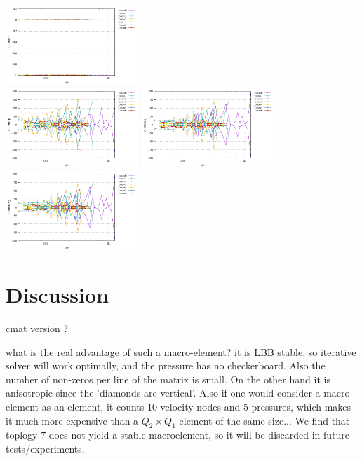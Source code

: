 \begin{center}
\includegraphics[width=5cm]{python_codes/fieldstone_78/results/stats_v_exp14.pdf}\\
\includegraphics[width=5cm]{python_codes/fieldstone_78/results/stats_p_exp14.pdf}
\includegraphics[width=5cm]{python_codes/fieldstone_78/results/stats_q1_exp14.pdf}
\includegraphics[width=5cm]{python_codes/fieldstone_78/results/stats_q2_exp14.pdf}
\end{center}







\newpage

\section*{Discussion}

cmat version ? 

what is the real advantage of such a macro-element? it is LBB stable, so 
iterative solver will work optimally, and the pressure has no checkerboard.
Also the number of non-zeros per line of the matrix is small.  
On the other hand it is anisotropic since the 'diamonds are vertical'. 
Also if one would consider a macro-element as an element, it counts 10 velocity nodes and 5 pressures, 
which makes it much more expensive than a $Q_2\times Q_1$ element of the same size...
We find that toplogy 7 does not yield a stable macroelement, so it will be discarded in 
future tests/experiments.

